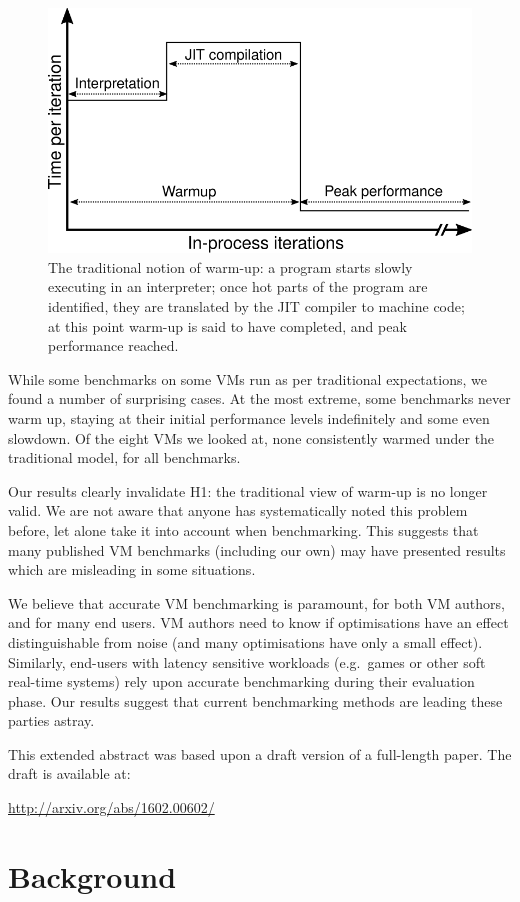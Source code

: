 \documentclass[preprint]{sigplanconf}
\newcommand{\hypone}{H1\xspace}
\begin{document}
\begin{figure}[t]
\centering
\includegraphics[width=.5\textwidth]{img/picturebook_warmup}
\caption{The traditional notion of warm-up: a program starts slowly executing in
an interpreter; once hot parts of the program are identified, they are
translated by the JIT compiler to machine code; at this point warm-up
is said to have completed, and peak performance reached.}
\label{fig:trad}
\end{figure}

While some benchmarks on some VMs run as per
traditional expectations, we found a number of surprising cases. At
the most extreme, some benchmarks never warm up, staying at their initial performance
levels indefinitely and some even slowdown. Of the eight
VMs we looked at, none consistently warmed under the traditional model, for
all benchmarks.

Our results clearly invalidate \hypone: the traditional view of warm-up is no longer
valid. We are not aware that anyone has systematically noted this
problem before, let alone take it into account when benchmarking. This suggests
that many published VM benchmarks (including our own) may have presented
results which are misleading in some situations.

We believe that accurate VM benchmarking is paramount, for both VM authors, and
for many end users. VM authors need to know if optimisations have an effect
distinguishable from noise (and many optimisations have only a small effect).
Similarly, end-users with latency sensitive workloads (e.g.~games or other soft
real-time systems) rely upon accurate benchmarking during their evaluation
phase. Our results suggest that current benchmarking methods are leading
these parties astray.

This extended abstract was based upon a draft version of a full-length paper.
The draft is available at:
\begin{center}
\url{http://arxiv.org/abs/1602.00602/}
\end{center}

\section{Background}
\label{sec:warmup}
\end{document}
